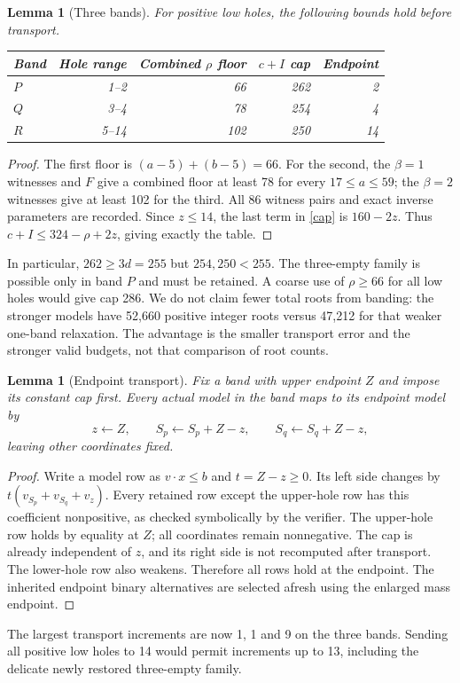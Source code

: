 \documentclass[11pt,a4paper]{article}
\newtheorem{lemma}[theorem]{Lemma}
\begin{document}
\begin{lemma}[Three bands]\label{bands}
For positive low holes, the following bounds hold before transport.
\begin{center}
\begin{tabular}{lrrrr}\toprule
Band&Hole range&Combined $\rho$ floor&$c+I$ cap&Endpoint\\\midrule
$P$&1--2&66&262&2\\
$Q$&3--4&78&254&4\\
$R$&5--14&102&250&14\\\bottomrule
\end{tabular}
\end{center}
\end{lemma}
\begin{proof}
The first floor is $(a-5)+(b-5)=66$. For the second, the $\beta=1$
witnesses and $F$ give a combined floor at least 78 for every
$17\le a\le59$; the $\beta=2$ witnesses give at least 102 for the third.
All 86 witness pairs and exact inverse parameters are recorded.
Since $z\le14$, the last term in \eqref{cap} is $160-2z$.
Thus $c+I\le324-\rho+2z$, giving exactly the table.
\end{proof}
In particular, $262\ge3d=255$ but $254,250<255$.
The three-empty family is possible only in band $P$ and must be retained.
A coarse use of $\rho\ge66$ for all low holes would give cap 286.
We do not claim fewer total roots from banding: the stronger models
have 52,660 positive integer roots versus 47,212 for that weaker
one-band relaxation. The advantage is the smaller transport error and
the stronger valid budgets, not that comparison of root counts.

\begin{lemma}[Endpoint transport]\label{transport}
Fix a band with upper endpoint $Z$ and impose its constant cap first.
Every actual model in the band maps to its endpoint model by
\[
 z\leftarrow Z,\qquad S_p\leftarrow S_p+Z-z,\qquad
 S_q\leftarrow S_q+Z-z,
\]
leaving other coordinates fixed.
\end{lemma}
\begin{proof}
Write a model row as $v\cdot x\le b$ and $t=Z-z\ge0$.
Its left side changes by
$t(v_{S_p}+v_{S_q}+v_z)$. Every retained row except the upper-hole
row has this coefficient nonpositive, as checked symbolically by the
verifier. The upper-hole row holds by equality at $Z$; all coordinates
remain nonnegative. The cap is already independent of $z$, and its
right side is not recomputed after transport. The lower-hole row also
weakens. Therefore all rows hold at the endpoint. The inherited endpoint
binary alternatives are selected afresh using the enlarged mass endpoint.
\end{proof}
The largest transport increments are now 1, 1 and 9 on the three bands.
Sending all positive low holes to 14 would permit increments up to 13,
including the delicate newly restored three-empty family.
\end{document}
